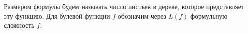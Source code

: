 




\setcounter{curtask}{6}

\begin{definition}
    Размером формулы будем называть число листьев в дереве, которое представляет эту функцию. Для булевой
    функции $f$ обозначим через $L(f)$ формульную сложность $f$.
\end{definition}



\breakline



